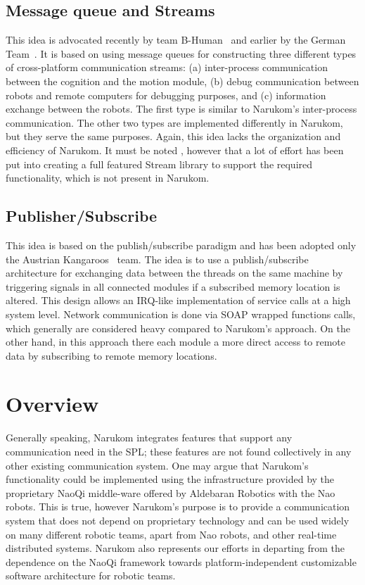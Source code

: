 \subsection{Message queue and Streams}
This idea is advocated recently by team B-Human~\cite{BHuman2009} and earlier by the German
Team~\cite{GT2005}. It is based on using message queues for constructing three different types of cross-platform
communication streams: (a) inter-process communication between the cognition and the motion module, (b) debug
communication between robots and remote computers for debugging purposes, and (c) information exchange between the
robots. The first type is similar to Narukom's inter-process communication. The other two types are implemented
differently in Narukom, but they serve the same purposes. Again, this idea lacks the organization and efficiency of
Narukom. It must be noted , however that a lot of effort has been put into creating a full featured Stream library to support the required functionality, which is not present in Narukom.
\subsection{Publisher/Subscribe}
This idea is based on the publish/subscribe paradigm and has been adopted only the Austrian
Kangaroos~\cite{Austrian-Kangaroos} team. The idea is to use a publish/subscribe architecture for exchanging data between the threads on the same machine by
triggering signals in all connected modules if a subscribed memory location is altered. This design allows an IRQ-like implementation of service calls at a high system level. Network communication is done via SOAP wrapped functions calls, which generally are considered heavy compared to Narukom's approach. On the other hand, in this approach there each module a more direct access to remote data by subscribing to remote memory locations.
\section{Overview}
Generally speaking, Narukom integrates features that support any communication need in the SPL; these features are not
found collectively in any other existing communication system. One may argue that Narukom's functionality could be
implemented using the infrastructure provided by the proprietary NaoQi middle-ware offered by Aldebaran Robotics with
the Nao robots. This is true, however Narukom's purpose is to provide a communication system that does not depend on
proprietary technology and can be used widely on many different robotic teams, apart from Nao robots, and other
real-time distributed systems. Narukom also represents our efforts in departing from the dependence on the NaoQi
framework towards platform-independent customizable software architecture for robotic teams. 